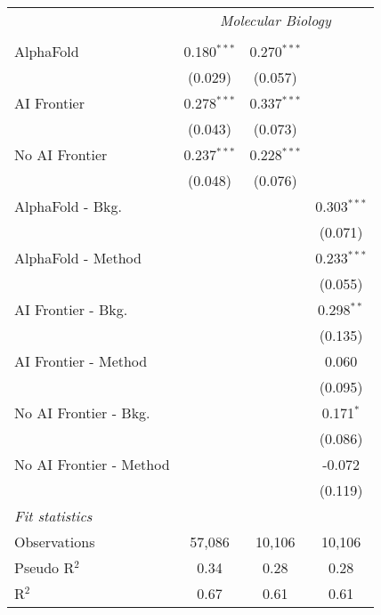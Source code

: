 \begin{tabular}{lccc}
 & \multicolumn{3}{c}{\textit{Molecular Biology}} \\ \\
   AlphaFold               & 0.180$^{***}$ & 0.270$^{***}$ &   \\   
                           & (0.029)       & (0.057)       &   \\   
   AI Frontier             & 0.278$^{***}$ & 0.337$^{***}$ &   \\   
                           & (0.043)       & (0.073)       &   \\   
   No AI Frontier          & 0.237$^{***}$ & 0.228$^{***}$ &   \\   
                           & (0.048)       & (0.076)       &   \\   
   AlphaFold - Bkg.        &               &               & 0.303$^{***}$\\   
                           &               &               & (0.071)\\   
   AlphaFold - Method      &               &               & 0.233$^{***}$\\   
                           &               &               & (0.055)\\   
   AI Frontier - Bkg.      &               &               & 0.298$^{**}$\\   
                           &               &               & (0.135)\\   
   AI Frontier - Method    &               &               & 0.060\\   
                           &               &               & (0.095)\\   
   No AI Frontier - Bkg.   &               &               & 0.171$^{*}$\\   
                           &               &               & (0.086)\\   
   No AI Frontier - Method &               &               & -0.072\\   
                           &               &               & (0.119)\\   
   \midrule
   \emph{Fit statistics}\\
   Observations            & 57,086        & 10,106        & 10,106\\  
   Pseudo R$^2$            & 0.34          & 0.28          & 0.28\\  
   R$^2$                   & 0.67          & 0.61          & 0.61\\  
   

\end{tabular}
